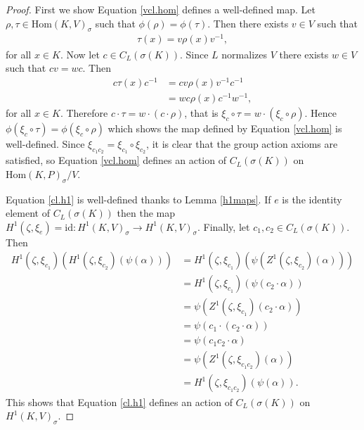 \begin{proof}
	First we show Equation \ref{vcl.hom} defines a well-defined map. Let $\rho, \tau \in \mathrm{Hom}(K, V)_\sigma$ such that $\phi(\rho) = \phi(\tau)$. Then there exists $v \in V$ such that
	\begin{align*} \tau(x) = v\rho(x)v^{-1}, \end{align*}
		for all $x \in K$. Now let $c \in C_L(\sigma(K))$. Since $L$ normalizes $V$ there exists $w \in V$ such that $cv = wc$. Then
		\begin{align*}
			c \tau(x)c^{-1}
			&= cv \rho(x) v^{-1}c^{-1} \\
			&= wc \rho(x) c^{-1}w^{-1},
		\end{align*}
		for all $x \in K$. Therefore $c\cdot\tau = w\cdot(c\cdot\rho)$, that is $\xi_c \circ\tau = w\cdot(\xi_c\circ\rho)$. Hence $\phi(\xi_c \circ \tau) = \phi(\xi_c \circ \rho)$ which shows the map defined by Equation \ref{vcl.hom} is well-defined. Since $\xi_{c_1c_2} = \xi_{c_1} \circ \xi_{c_2}$, it is clear that the group action axioms are satisfied, so Equation \ref{vcl.hom} defines an action of $C_L(\sigma(K))$ on $\mathrm{Hom}(K, P)_\sigma/V$.

		Equation \ref{cl.h1} is well-defined thanks to Lemma \ref{h1maps}. If $e$ is the identity element of $C_L(\sigma(K))$ then the map $H^1(\zeta, \xi_e) = \mathrm{id}:H^1(K, V)_\sigma \rightarrow H^1(K, V)_\sigma$. Finally, let $c_1, c_2 \in C_L(\sigma(K))$. Then
		\begin{align}
			H^1(\zeta, \xi_{c_1})\left(H^1(\zeta, \xi_{c_2})(\psi(\alpha))\right)
			&= H^1(\zeta, \xi_{c_1})\left(\psi(Z^1(\zeta, \xi_{c_2})(\alpha))\right)\nonumber \\
			&= H^1(\zeta, \xi_{c_1})\left(\psi(c_2 \cdot \alpha)\right)\nonumber \\
			&= \psi\left( Z^1(\zeta, \xi_{c_1})(c_2 \cdot \alpha)\right)\nonumber \\
			&= \psi\left( c_1 \cdot (c_2 \cdot \alpha)\right)\nonumber \\
			&= \psi\left( c_1c_2 \cdot \alpha\right)\nonumber \\
			&= \psi\left( Z^1(\zeta, \xi_{c_1c_2})(\alpha)\right)\nonumber \\
			&= H^1(\zeta, \xi_{c_1c_2})\left(\psi(\alpha)\right).\label{eqn:functorial}
		\end{align}
		This shows that Equation \ref{cl.h1} defines an action of $C_L(\sigma(K))$ on $H^1(K, V)_\sigma$.


\end{proof}
